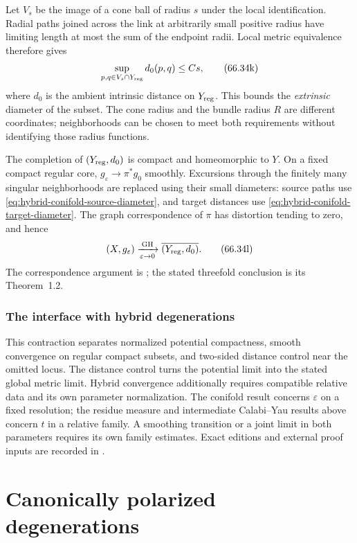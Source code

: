 Let $V_s$ be the image of a cone ball of radius $s$ under the local
identification. Radial paths joined across the link at arbitrarily
small positive radius have limiting length at most the sum of the
endpoint radii. Local metric equivalence therefore gives
\[
 \sup_{p,q\in V_s\cap Y_{\rm reg}}d_0(p,q)\leq Cs,
\tag{66.34k}\label{eq:hybrid-conifold-target-diameter}
\]
where $d_0$ is the ambient intrinsic distance on $Y_{\rm reg}$.
This bounds the \emph{extrinsic} diameter of the subset.
The cone radius and the bundle radius $R$ are different coordinates;
neighborhoods can be chosen to meet both requirements without
identifying those radius functions.

The completion of $(Y_{\rm reg},d_0)$ is compact and homeomorphic to
$Y$. On a fixed compact regular core,
$g_\varepsilon\to\pi^*g_0$ smoothly. Excursions through the finitely
many singular neighborhoods are replaced using their small diameters:
source paths use \eqref{eq:hybrid-conifold-source-diameter}, and target
distances use \eqref{eq:hybrid-conifold-target-diameter}.
The graph correspondence of $\pi$ has distortion tending to zero,
and hence
\[
 (X,g_\varepsilon)\xrightarrow[\varepsilon\to0]{\rm GH}
    \overline{(Y_{\rm reg},d_0)}.
\tag{66.34l}\label{eq:hybrid-conifold-GH}
\]
The correspondence argument is
\cite[Proposition~5.1]{GuyettMcGowan26ConifoldV1}; the stated
threefold conclusion is its Theorem~1.2.

\subsubsection{The interface with hybrid degenerations}

This contraction separates normalized potential compactness, smooth
convergence on regular compact subsets, and two-sided distance control
near the omitted locus. The distance control turns the potential limit
into the stated global metric limit. Hybrid convergence additionally
requires compatible relative data and its own parameter normalization.
The conifold result concerns $\varepsilon$ on a fixed resolution;
the residue measure and intermediate Calabi--Yau results above concern
$t$ in a relative family. A smoothing transition or a joint limit in
both parameters requires its own family estimates. Exact editions and
external proof inputs are recorded in
.


\section{Canonically polarized degenerations}
\label{sec:hybrid-ke}


